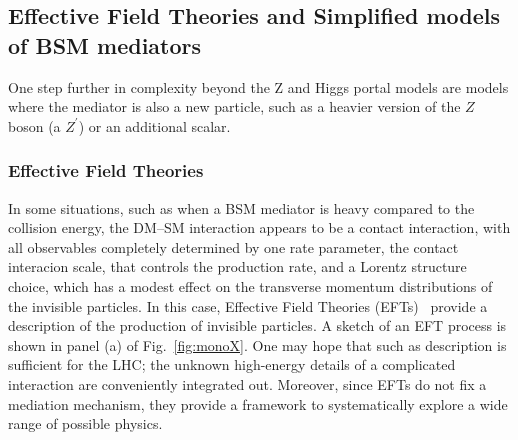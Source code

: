 

\subsection{Effective Field Theories and Simplified models of BSM mediators}
\label{sec:BSMMediatorModels}

One step further in complexity beyond the Z and Higgs portal models are models where the mediator is also a new particle, such as a heavier version of the $Z$ boson (a $Z^\prime$) or an additional scalar.






\subsubsection{Effective Field Theories}
\label{sub:EFT}


In some situations, such as when a BSM mediator is heavy compared to the collision energy, the DM--SM interaction appears to be a contact interaction, with all observables completely determined by one rate parameter, the contact interacion scale, that controls the production rate, and a Lorentz structure choice, which has a modest effect on the transverse momentum distributions of the invisible particles.
In this case, Effective Field Theories (EFTs)~\cite{Goodman:2010ku, Shoemaker:2011vi,Bai:2010hh} provide a description of the production of invisible particles.
A sketch of an EFT process is shown in panel (a) of Fig.~\ref{fig:monoX}.
One may hope that such as description is sufficient for the LHC; the unknown high-energy details of a complicated interaction are conveniently integrated out.
Moreover, since EFTs do not fix a mediation mechanism, they provide a framework to systematically explore a wide range of possible physics.

